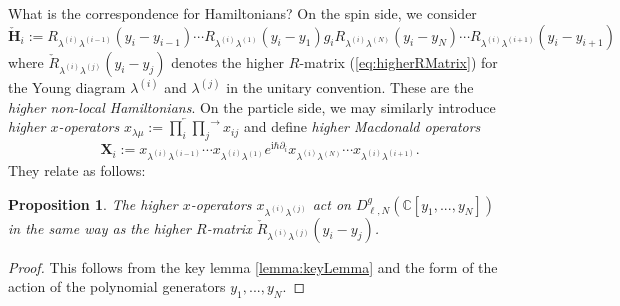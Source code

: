 \documentclass[11pt]{report}
\newtheorem{prop}[theorem]{Proposition}
\theoremstyle{definition}
\theoremstyle{remark}
\theoremstyle{remark}
\newcommand{\C}{\mathbb{C}}
\newcommand{\I}{\mathrm{i}}
\begin{document}
What is the correspondence for Hamiltonians? On the spin side, %
we consider
\begin{equation*}
\mathbf{\check H}_i := R_{\lambda^{(i)}\lambda^{(i-1)}}(y_i-y_{i-1}) \cdots R_{\lambda^{(i)}\lambda^{(1)}}(y_i-y_1) g_i R_{\lambda^{(i)}\lambda^{(N)}}(y_i-y_N) \cdots R_{\lambda^{(i)}\lambda^{(i+1)}}(y_i-y_{i+1})
\end{equation*}
where $\check R_{\lambda^{(i)}\lambda^{(j)}}(y_i-y_j)$ denotes the higher $R$-matrix (\ref{eq:higherRMatrix}) for the Young diagram $\lambda^{(i)}$ and $\lambda^{(j)}$ in the unitary convention. These are the \emph{higher non-local Hamiltonians}. %
On the particle side, we may similarly introduce \emph{higher $x$-operators} $x_{\lambda \mu} := \overleftarrow{\prod_i} \overrightarrow{\prod_j} x_{ij}$ and define \emph{higher Macdonald operators}
\begin{equation*}
\mathbf{X}_i := x_{\lambda^{(i)}\lambda^{(i-1)}} \cdots x_{\lambda^{(i)}\lambda^{(1)}} e^{\I\hbar\partial_i} x_{\lambda^{(i)}\lambda^{(N)}} \cdots x_{\lambda^{(i)}\lambda^{(i+1)}}.
\end{equation*}
They relate as follows:

\begin{prop}
The higher $x$-operators $x_{\lambda^{(i)}\lambda^{(j)}}$ act on $D_{\ell,N}^g(\C[y_1,...,y_N])$ in the same way as the higher $R$-matrix $\check R_{\lambda^{(i)}\lambda^{(j)}}(y_i-y_j)$.
\end{prop}

\begin{proof}
This follows from the key lemma \ref{lemma:keyLemma} and the form of the action of the polynomial generators $y_1,...,y_N$.
\end{proof}
\end{document}
